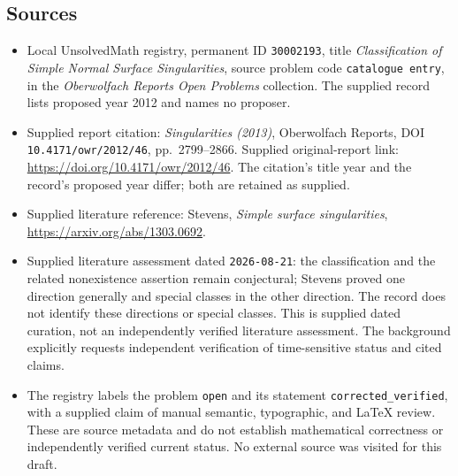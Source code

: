 \documentclass[11pt]{article}
\begin{document}
\subsection{Sources}
\begin{itemize}
\item Local UnsolvedMath registry, permanent ID \texttt{30002193}, title \emph{Classification of Simple Normal Surface Singularities}, source problem code \texttt{catalogue entry}, in the \emph{Oberwolfach Reports Open Problems} collection. The supplied record lists proposed year 2012 and names no proposer.
\item Supplied report citation: \emph{Singularities (2013)}, Oberwolfach Reports, DOI \texttt{10.4171/owr/2012/46}, pp.~2799--2866. Supplied original-report link: \url{https://doi.org/10.4171/owr/2012/46}. The citation's title year and the record's proposed year differ; both are retained as supplied.
\item Supplied literature reference: Stevens, \emph{Simple surface singularities}, \url{https://arxiv.org/abs/1303.0692}.
\item Supplied literature assessment dated \texttt{2026-08-21}: the classification and the related nonexistence assertion remain conjectural; Stevens proved one direction generally and special classes in the other direction. The record does not identify these directions or special classes. This is supplied dated curation, not an independently verified literature assessment. The background explicitly requests independent verification of time-sensitive status and cited claims.
\item The registry labels the problem \texttt{open} and its statement \texttt{corrected\_verified}, with a supplied claim of manual semantic, typographic, and LaTeX review. These are source metadata and do not establish mathematical correctness or independently verified current status. No external source was visited for this draft.
\end{itemize}
\end{document}
